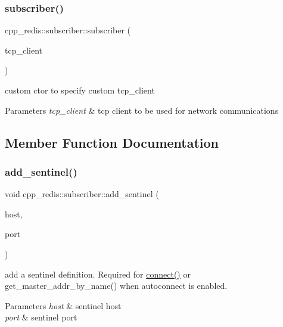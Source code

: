 \subsubsection{\texorpdfstring{subscriber()}{subscriber()}}
{\footnotesize\ttfamily cpp\+\_\+redis\+::subscriber\+::subscriber (\begin{DoxyParamCaption}\item[{const std\+::shared\+\_\+ptr$<$ \hyperlink{classcpp__redis_1_1network_1_1tcp__client__iface}{network\+::tcp\+\_\+client\+\_\+iface} $>$ \&}]{tcp\+\_\+client }\end{DoxyParamCaption})\hspace{0.3cm}{\ttfamily [explicit]}}

custom ctor to specify custom tcp\+\_\+client


\begin{DoxyParams}{Parameters}
{\em tcp\+\_\+client} & tcp client to be used for network communications \\
\hline
\end{DoxyParams}


\subsection{Member Function Documentation}
\mbox{\label{classcpp__redis_1_1subscriber_a10584e201abe4e701b70d078b3a676fc}} 
\subsubsection{\texorpdfstring{add\+\_\+sentinel()}{add\_sentinel()}}
{\footnotesize\ttfamily void cpp\+\_\+redis\+::subscriber\+::add\+\_\+sentinel (\begin{DoxyParamCaption}\item[{const std\+::string \&}]{host,  }\item[{std\+::size\+\_\+t}]{port }\end{DoxyParamCaption})}

add a sentinel definition. Required for \hyperlink{classcpp__redis_1_1subscriber_a6ae8134a9a9b31d6f2434ec4f6e86d3a}{connect()} or get\+\_\+master\+\_\+addr\+\_\+by\+\_\+name() when autoconnect is enabled.


\begin{DoxyParams}{Parameters}
{\em host} & sentinel host \\
\hline
{\em port} & sentinel port \\
\hline
\end{DoxyParams}
\mbox{\label{classcpp__redis_1_1subscriber_a7b4564fc4dfe356b95aeae4fdb8071c9}} 
